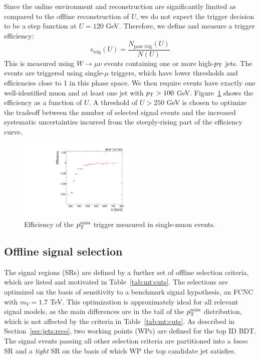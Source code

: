 Since the online environment and reconstruction are significantly limited as compared to the offline reconstruction of $U$, we do not expect the trigger decision to be a step function at $U=120$ GeV.
Therefore, we define and measure a trigger efficiency:
\begin{equation}
    \epsilon_\mathrm{trig} (U) = \frac{N_\text{pass trig}(U)}{N(U)}
\end{equation}
This is measured using $W\rightarrow\mu\nu$ events containing one or more high-$p_\mathrm{T}$ jets.
The events are triggered using single-$\mu$ triggers, which have lower thresholds and efficiencies close to 1 in this phase space.
We then require events have exactly one well-identified muon and at least one jet with $p_\mathrm{T}>100$ GeV.
Figure~\ref{fig:mt:trigeff} shows the efficiency as a function of $U$.
A threshold of $U>250$ GeV is chosen to optimize the tradeoff between the number of selected signal events and the increased systematic uncertainties incurred from the steeply-rising part of the efficiency curve.

\begin{figure}[]
    \begin{center}
        \includegraphics[width=0.49\textwidth]{figures/monotop/trigger/trigeff_nmu1pfUWmag.pdf}
        \caption{Efficiency of the $p_\mathrm{T}^\mathrm{miss}$ trigger measured in single-muon events. }
        \label{fig:mt:trigeff}
    \end{center}
\end{figure}

\subsection{Offline signal selection}

The signal regions (SRs) are defined by a further set of offline selection criteria, which are listed and motivated in Table~\ref{tab:mt:cuts}.
The selections are optimized on the basis of sensitivity to a benchmark signal hypothesis, an FCNC with $m_V=1.7$ TeV.
This optimization is approximately ideal for all relevant signal models, as the main differences are in the tail of the $p_\mathrm{T}^\mathrm{miss}$ distribution, which is not affected by the criteria in Table~\ref{tab:mt:cuts}.
As described in Section~\ref{sec:jets:reco}, two working points (WPs) are defined for the top ID BDT.
The signal events passing all other selection criteria are partitioned into a \emph{loose} SR and a \emph{tight} SR on the basis of which WP the top candidate jet satisfies.

